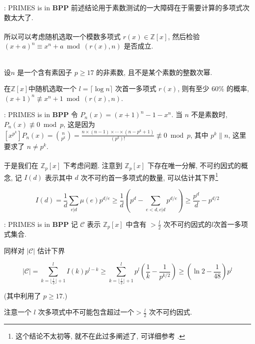\documentclass{beamer}
\def\ge{\geqslant}
\begin{document}
\begin{frame}{\cite{AB99}: \textsf{PRIMES} is in \textbf{BPP}}
	前述结论用于素数测试的一大障碍在于需要计算的多项式次数太大了.\\~\\
	
	所以可以考虑随机选取一个模数多项式 $r(x) \in \mathbb Z[x]$, 然后检验$(x + a)^n \equiv x^n + a \bmod (r(x), n)$ 是否成立.\\~\\

	\begin{theorem}
		设$n$ 是一个含有素因子 $p \ge 17$ 的非素数, 且不是某个素数的整数次幂.
		
		在$\mathbb Z[x]$中随机选取一个 $l = \lceil \log n \rceil$ 次首一多项式 $r(x)$, 则有至少 $60\%$ 的概率, $(x + 1)^n \not\equiv x^n + 1 \bmod (r(x), n)$.
	\end{theorem}
	
\end{frame}
\begin{frame}{\cite{AB99}: \textsf{PRIMES} is in \textbf{BPP}}
	令 $P_n(x) = (x + 1)^n - 1 - x^n$. 当 $n$ 不是素数时, $P_n(x) \not\equiv 0 \bmod p$, 这是因为$[x^{p^k}] P_n(x) = \binom{n}{p^k} = \frac{n \times (n-1) \times \cdots \times (n-p^k+1)}{(p^k)!} \not\equiv 0 \bmod p$, 其中 $p^k \| n$, 这里要求了 $n \neq p^k$.\\~\\

	于是我们在 $\mathbb Z_p[x]$ 下考虑问题. 注意到 $\mathbb Z_p[x]$ 下存在唯一分解, 不可约因式的概念, 记 $I(d)$ 表示其中 $d$ 次不可约首一多项式的数量, 可以估计其下界\footnote{\tiny 这个结论不太初等, 就不在此过多阐述了, 可详细参考 \cite{lidl_niederreiter_1994}.}

	$$ I(d) = \frac{1}{d}\sum_{e | d}\mu(e)p^{d/e} \ge \frac{1}{d}\left( p^d -  \sum_{e < d, e | d}p^{d/e}\right) \ge \frac{p^d}{d} - p^{d/2} $$
\end{frame}
\begin{frame}{\cite{AB99}: \textsf{PRIMES} is in \textbf{BPP}}
	记 $\mathcal C$ 表示 $\mathbb Z_p[x]$ 中含有 $> \frac{l}{2}$ 次不可约因式的$l$次首一多项式集合. 
	
	同样对 $|\mathcal C|$ 估计下界

	$$|\mathcal C| = \sum_{k = \lfloor \frac l2 \rfloor + 1}^{l}I(k)p^{l-k} \ge \sum_{k = \lfloor \frac l2 \rfloor + 1}^{l}p^l\left(\frac 1k - \frac{1}{p^{k/2}}\right) \ge \left(\ln 2 - \frac{1}{48}\right)p^l$$

	(其中利用了 $p \ge 17$.)

	注意一个 $l$ 次多项式中不可能包含超过一个$> \frac{l}{2}$ 次不可约因式.
\end{frame}
\end{document}
